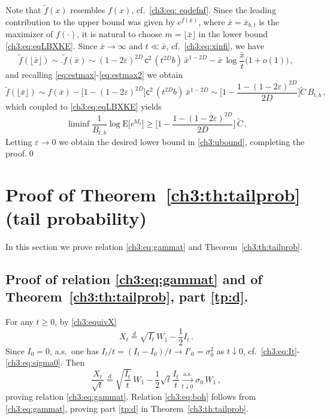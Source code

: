 \documentclass[a4paper,reqno,11pt]{amsart}
\numberwithin{equation}{section}
\renewcommand{\tilde}{\widetilde}          %
\newcommand{\PEfont}{\mathrm}
\newcommand{\E}{\ensuremath{\PEfont E}}
\renewcommand{\epsilon}{\varepsilon}
\newcommand\sfc{\mathsf{c}}
\begin{document}
Note that $\tilde f(x)$ resembles $f(x)$,
cf.\ \eqref{ch3:eq: eqdefnf}. Since the leading contribution to the upper bound was 
given by $e^{f(\bar x)}$, where $\bar x = \bar x_{b,t}$ is
the maximizer of $f(\cdot)$, it is natural to 
choose $m = \lfloor \bar x \rfloor$ in the lower bound \eqref{ch3:eq:eqLBXKE}. 
Since $\bar x \to \infty$ and $t \ll \bar x$,
cf.\ \eqref{ch3:eq:xinfi}, we have
\begin{equation*}
	\tilde f(\lfloor\bar x\rfloor) \sim. \tilde f(\bar x) \sim
	 (1-2\epsilon)^{2D}\, \sfc^2 \, (t^{2D} b) \, \bar x^{1-2D} -
	\bar x \, \log \frac{\bar x}{t} \big(1+o(1)\big)   \,,
\end{equation*}
and recalling \eqref{eq:estmax}-\eqref{eq:estmax2} we obtain
\begin{equation*}
	\tilde f(\lfloor\bar x\rfloor) \sim f(\bar x) -
      \big[1 - (1-2\varepsilon)^{2D}\big]
       \sfc^2 \, (t^{2D} b) \, \bar x^{1-2D}   \sim 
       \bigg[1 - \frac{1 - (1-2\varepsilon)^{2D}}{2D}\bigg]
       \tilde C \, B_{t,b} \,,
\end{equation*}
which coupled to \eqref{ch3:eq:eqLBXKE} yields
\[
 \liminf \frac{1}{B_{t,b}}\log \E\big[e^{bI_t}\big]
 \geq   \bigg[1 - \frac{1 - (1-2\varepsilon)^{2D}}{2D}\bigg] \, \tilde C \,.
\]
Letting $\varepsilon \to 0$ we obtain the
desired lower bound in \eqref{ch3:ubound},
completing the proof.\qed



\section{Proof of Theorem~\ref{ch3:th:tailprob} (tail probability)}
\label{ch3:sec:LDP}

In this section we prove relation \eqref{ch3:eq:gammat}
and Theorem~\ref{ch3:th:tailprob}.



\subsection{Proof of relation \eqref{ch3:eq:gammat} and of
Theorem~\ref{ch3:th:tailprob}, part \eqref{tp:d}.}
\label{ch3:eq:gammatsec}

For any $t \ge 0$,  by \eqref{ch3:equivX}
\begin{equation*}
	X_t \overset{d}{=} \sqrt{I_t} \, W_1 - \frac{1}{2} I_t \,.
\end{equation*}
Since $I_0 = 0$, a.s.\ 
one has $I_t/t = (I_t - I_0)/t \to I'_0 = \sigma_0^2$ as $t \downarrow 0$,
cf.\ \eqref{ch3:eq:It}-\eqref{ch3:eq:sigma0}. Then
\begin{equation*}
	\frac{X_t}{\sqrt{t}} 
	\overset{d}{=} \sqrt{\frac{I_t}{t}} \, W_1 - \frac{1}{2}
	\sqrt{t} \frac{I_t}{t} \xrightarrow[t\downarrow 0]{\text{a.s.}}
	\sigma_0 \, W_1 \,,
\end{equation*}
proving relation \eqref{ch3:eq:gammat}.
Relation \eqref{ch3:eq:boh} follows
from \eqref{ch3:eq:gammat}, proving
part \eqref{tp:d} in Theorem~\ref{ch3:th:tailprob}. 
\end{document}
